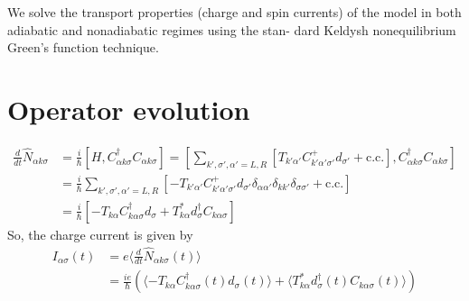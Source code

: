 \documentclass[11pt,a4paper]{article}
\begin{document}
We solve the transport properties (charge and spin currents) of the model in both adiabatic and nonadiabatic regimes using the stan- dard Keldysh nonequilibrium Green’s function technique.
\section{Operator evolution}
\begin{equation}
\begin{split}
\frac{d}{dt}\hat{N}_{\alpha k\sigma} &= \frac{i}{\hbar}[H, C_{\alpha k\sigma}^{\dag}C_{\alpha k\sigma}] = \left[\sum_{k', \sigma', \alpha'=L, R}\left[T_{k' \alpha'} C_{k' \alpha' \sigma'}^{+} d_{\sigma'}+\mathrm{c.c.}\right], C_{\alpha k\sigma}^{\dag}C_{\alpha k\sigma}\right]\\
&=\frac{i}{\hbar}\sum_{k', \sigma', \alpha'=L, R}\left[ -T_{k' \alpha'} C_{k' \alpha' \sigma'}^{+} d_{\sigma'}\delta_{\alpha\alpha'}\delta_{kk'}\delta_{\sigma\sigma'}+\mathrm{c.c.}\right]\\
&=\frac{i}{\hbar}[-T_{k \alpha} C_{k \alpha \sigma}^{\dag} d_{\sigma} + T_{k \alpha}^{*} d_{\sigma}^{\dag}C_{k \alpha \sigma}]
\end{split}
\end{equation}
So, the charge current is given by
\begin{equation}
\begin{split}
I_{\alpha\sigma}(t) &= e\langle\frac{d}{dt}\hat{N}_{\alpha k\sigma}(t)\rangle \\
&=\frac{ie}{\hbar}(\langle -T_{k \alpha} C_{k \alpha \sigma}^{\dag}(t) d_{\sigma}(t)\rangle + \langle T_{k \alpha}^{*} d_{\sigma}^{\dag}(t)C_{k \alpha \sigma}(t)\rangle)
\end{split}
\end{equation}
\end{document}
